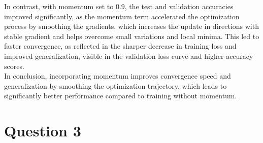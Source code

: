 \documentclass[12pt,a4paper]{article}
\begin{document}
        In contrast, with momentum set to 0.9, the test and validation accuracies improved significantly, as the momentum term accelerated the optimization process by smoothing the gradients, which increases the update in directions with stable gradient and helps overcome small variations and local minima. This led to faster convergence, as reflected in the sharper decrease in training loss and improved generalization, visible in the validation loss curve and higher accuracy scores. \\
        In conclusion, incorporating momentum improves convergence speed and generalization by smoothing the optimization trajectory, which leads to significantly better performance compared to training without momentum.


    \newpage
    \section{Question 3}
\end{document}
